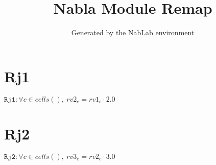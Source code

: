 \documentclass[11pt]{article}
\title{Nabla Module Remap}
\author{Generated by the NabLab environment}
\begin{document}
\maketitle


\section{Rj1}
$\texttt{Rj1} : \forall{c\in cells()}, \ rv2_{c} = rv1_{c} \cdot 2.0$


\section{Rj2}
$\texttt{Rj2} : \forall{c\in cells()}, \ rv3_{c} = rv2_{c} \cdot 3.0$
\end{document}
